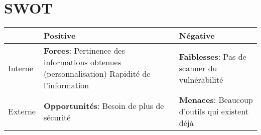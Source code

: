 \section{SWOT}
\begin{tabular}{|l|p{5cm}|p{5cm}|}
  \hline
  \rowcolor{Gainsboro} & Positive & Négative \\
  \hline

  Interne & \textbf{Forces}: Pertinence des informations obtenues (personnalisation) Rapidité de l’information & \textbf{Faiblesses}: Pas de scanner du vulnérabilité
  \\
  \hline

  Externe & \textbf{Opportunités}: Besoin de plus de sécurité & \textbf{Menaces}: Beaucoup d’outils qui existent déjà \\
  \hline
\end{tabular}
